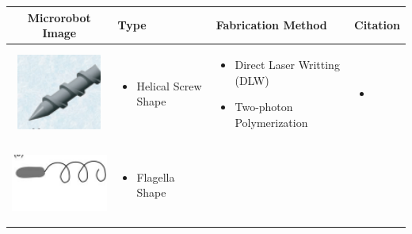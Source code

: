 \documentclass[12pt,a4paper,titlepage]{report}
\begin{document}
\begin{table}[h!]
  \centering

\setlength{\arrayrulewidth}{.6mm}
\setlength{\tabcolsep}{5pt}
\renewcommand{\arraystretch}{.8}


  \begin{tabular}{ c  m{3cm}  m{4.3cm} m{3cm} }
    \hline
\rowcolor{lightgray}
    Microrobot Image & Type  & Fabrication Method & Citation \\ \hline\hline
    \begin{minipage}{.3\textwidth}
      \includegraphics[width=\linewidth, height=25mm]{screw_ta}
    \end{minipage}
    &
      \begin{itemize}
        \item Helical Screw Shape
    
      \end{itemize}
    & 
      \begin{itemize}
        \item Direct Laser Writting (DLW)
	\item Two-photon Polymerization
   
      \end{itemize}
	&
	   \begin{itemize}
        \item \citep{peyer2013magnetic}
   
      \end{itemize}
    \\ \hline

 \begin{minipage}{.3\textwidth}
      \includegraphics[width=\linewidth, height=25mm]{flagella_ta}
    \end{minipage}
    &
      \begin{itemize}
        \item Flagella Shape
      

\end{itemize}
\end{tabular}
\end{table}
\end{document}
